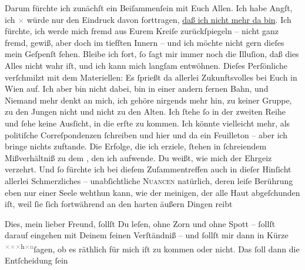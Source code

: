                Darum fürchte ich zunächſt ein Beiſammenſein mit Euch Allen. Ich habe Angſt, ich \textcolor{gray}{×} würde nur den Eindruck davon
               forttragen, \uline{daß ich nicht mehr da bin}. Ich fürchte,
               ich werde mich fremd aus Eurem Kreiſe zurückſpiegeln – nicht ganz fremd, gewiß, {\pb}aber doch im tiefſten Innern – und ich möchte nicht
               gern \introOben{}dieſes\introOben{} mein Geſpenſt ſehen. Bleibe ich fort, ſo ſagt
               mir immer noch die Illuſion, daß dies Alles nicht wahr iſt, und ich kann mich langſam
                   entwöhnen. Dieſes Perſönliche verſchmilzt mit dem Materiellen: Es ſprießt da
               allerlei Zukunftsvolles bei Euch in Wien auf. Ich
               aber bin nicht dabei, bin in einer andern fernen Bahn, und Niemand mehr denkt an
               mich, ich gehöre nirgends mehr hin, zu keiner Gruppe, zu den Jungen nicht und nicht
               zu den Alten. Ich ſtehe ſo {\pb}in der zweiten Reihe und
               ſehe keine Ausſicht, in die erſte zu kommen. Ich könnte vielleicht mehr, als
               politiſche Correſpondenzen ſchreiben und hier und da ein Feuilleton – aber ich bringe
               nichts zuftande. Die Erfolge, die ich erziele, ſtehen in ſchreiendem Mißverhältniß zu
               dem \label{K_L02608-4v}\label{K_L02608-4}, den
               ich aufwende. Du weißt, wie mich der Ehrgeiz verzehrt.  Und ſo fürchte ich bei dieſem Zuſammentreffen auch in dieſer Hinſicht
               allerlei Schmerzliches – unabſichtliche \textsc{Nuancen} natürlich,
                   deren leiſe Berührung eben nur einer Seele
               wehthun  kann, wie der meinigen, der alle Haut
               abgeſchunden iſt, weil ſie ſich fortwährend an den harten {\pb}äußern Dingen reibt{\dotsfive}\pend
           
\pstart
           Dies, mein lieber Freund, ſollſt Du leſen, ohne Zorn und ohne Spott – ſollſt darauf
               eingehen mit Deinem feinen Verſtändniß – und ſollſt mir dann in Kürze \substVorne{}\textsuperscript{\textcolor{gray}{×}\-\textcolor{gray}{×}\-\textcolor{gray}{×}h\textcolor{gray}{×}\textcolor{gray}{n}}\substDazwischen{}ſagen\substHinten{}, ob  es räthlich für mich iſt zu kommen
               oder nicht. Das ſoll dann die Entſcheidung ſein{\dotsfour}\pend
           
